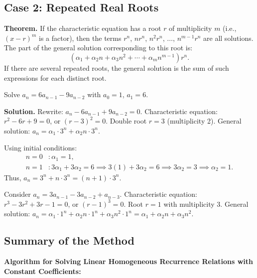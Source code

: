 \documentclass[11pt,a4paper]{article}
\begin{document}
\subsection{Case 2: Repeated Real Roots}

\textbf{Theorem.} If the characteristic equation has a root $r$ of multiplicity $m$ (i.e., $(x - r)^m$ is a factor), then the terms $r^n$, $n r^n$, $n^2 r^n$, $\dots$, $n^{m-1} r^n$ are all solutions. The part of the general solution corresponding to this root is:
\begin{equation*}
    (\alpha_1 + \alpha_2 n + \alpha_3 n^2 + \cdots + \alpha_m n^{m-1}) r^n.
\end{equation*}
If there are several repeated roots, the general solution is the sum of such expressions for each distinct root.

\begin{example}
Solve $a_n = 6a_{n-1} - 9a_{n-2}$ with $a_0 = 1$, $a_1 = 6$.

\textbf{Solution.} Rewrite: $a_n - 6a_{n-1} + 9a_{n-2} = 0$.
Characteristic equation: $r^2 - 6r + 9 = 0$, or $(r-3)^2 = 0$.
Double root $r = 3$ (multiplicity 2).
General solution: $a_n = \alpha_1 \cdot 3^n + \alpha_2 n \cdot 3^n$.

Using initial conditions:
\begin{align*}
    n = 0 &: \alpha_1 = 1, \\
    n = 1 &: 3\alpha_1 + 3\alpha_2 = 6 \implies 3(1) + 3\alpha_2 = 6 \implies 3\alpha_2 = 3 \implies \alpha_2 = 1.
\end{align*}
Thus, $a_n = 3^n + n \cdot 3^n = (n+1) \cdot 3^n$.
\end{example}

\begin{example}
Consider $a_n = 3a_{n-1} - 3a_{n-2} + a_{n-3}$.
Characteristic equation: $r^3 - 3r^2 + 3r - 1 = 0$, or $(r-1)^3 = 0$.
Root $r = 1$ with multiplicity 3.
General solution: $a_n = \alpha_1 \cdot 1^n + \alpha_2 n \cdot 1^n + \alpha_3 n^2 \cdot 1^n = \alpha_1 + \alpha_2 n + \alpha_3 n^2$.
\end{example}

\subsection{Summary of the Method}

\textbf{Algorithm for Solving Linear Homogeneous Recurrence Relations with Constant Coefficients:}
\end{document}
